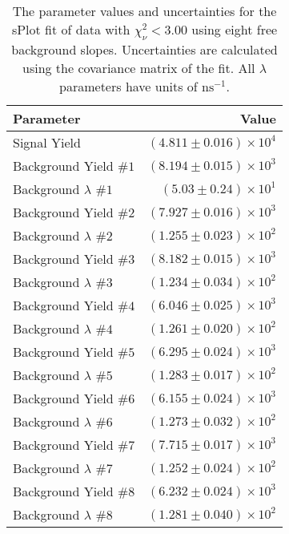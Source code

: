 
\begin{table}[ht]
    \begin{center}
        \begin{tabular}{lr}\toprule
            Parameter & Value \\\midrule
            Signal Yield & $(4.811 \pm 0.016) \times 10^{4}$ \\
            Background Yield $\#1$ & $(8.194 \pm 0.015) \times 10^{3}$ \\
            Background $\lambda$ $\#1$ & $(5.03 \pm 0.24) \times 10^{1}$ \\
            Background Yield $\#2$ & $(7.927 \pm 0.016) \times 10^{3}$ \\
            Background $\lambda$ $\#2$ & $(1.255 \pm 0.023) \times 10^{2}$ \\
            Background Yield $\#3$ & $(8.182 \pm 0.015) \times 10^{3}$ \\
            Background $\lambda$ $\#3$ & $(1.234 \pm 0.034) \times 10^{2}$ \\
            Background Yield $\#4$ & $(6.046 \pm 0.025) \times 10^{3}$ \\
            Background $\lambda$ $\#4$ & $(1.261 \pm 0.020) \times 10^{2}$ \\
            Background Yield $\#5$ & $(6.295 \pm 0.024) \times 10^{3}$ \\
            Background $\lambda$ $\#5$ & $(1.283 \pm 0.017) \times 10^{2}$ \\
            Background Yield $\#6$ & $(6.155 \pm 0.024) \times 10^{3}$ \\
            Background $\lambda$ $\#6$ & $(1.273 \pm 0.032) \times 10^{2}$ \\
            Background Yield $\#7$ & $(7.715 \pm 0.017) \times 10^{3}$ \\
            Background $\lambda$ $\#7$ & $(1.252 \pm 0.024) \times 10^{2}$ \\
            Background Yield $\#8$ & $(6.232 \pm 0.024) \times 10^{3}$ \\
            Background $\lambda$ $\#8$ & $(1.281 \pm 0.040) \times 10^{2}$ \\\bottomrule
        \end{tabular}
        \caption{The parameter values and uncertainties for the sPlot fit of data with $\chi^2_\nu < 3.00$ using eight free background slopes. Uncertainties are calculated using the covariance matrix of the fit. All $\lambda$ parameters have units of $\si{\nano\second}^{-1}$.}\label{tab:splot-fit-results-chisqdof-3.00-free-8}
    \end{center}
\end{table}
